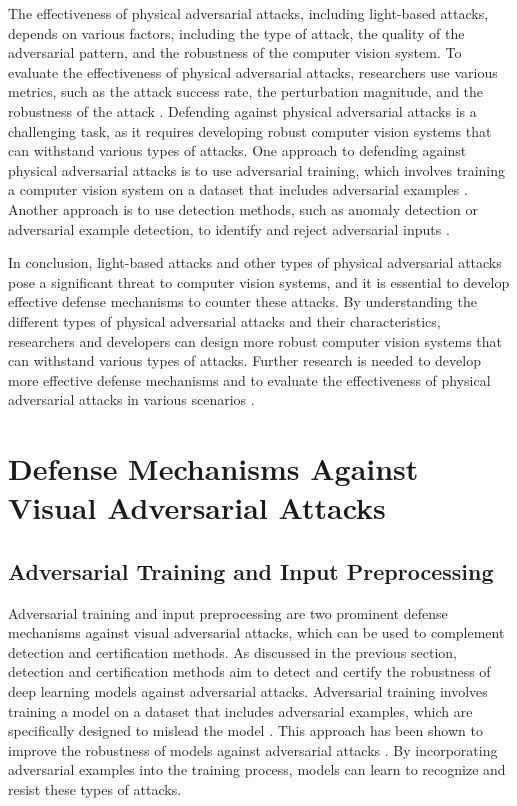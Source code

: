 \documentclass[11pt]{article}
\begin{document}
The effectiveness of physical adversarial attacks, including light-based attacks, depends on various factors, including the type of attack, the quality of the adversarial pattern, and the robustness of the computer vision system. To evaluate the effectiveness of physical adversarial attacks, researchers use various metrics, such as the attack success rate, the perturbation magnitude, and the robustness of the attack \cite{ref11}. Defending against physical adversarial attacks is a challenging task, as it requires developing robust computer vision systems that can withstand various types of attacks. One approach to defending against physical adversarial attacks is to use adversarial training, which involves training a computer vision system on a dataset that includes adversarial examples \cite{ref65}. Another approach is to use detection methods, such as anomaly detection or adversarial example detection, to identify and reject adversarial inputs \cite{ref66}.

In conclusion, light-based attacks and other types of physical adversarial attacks pose a significant threat to computer vision systems, and it is essential to develop effective defense mechanisms to counter these attacks. By understanding the different types of physical adversarial attacks and their characteristics, researchers and developers can design more robust computer vision systems that can withstand various types of attacks. Further research is needed to develop more effective defense mechanisms and to evaluate the effectiveness of physical adversarial attacks in various scenarios \cite{ref36}.

\section{Defense Mechanisms Against Visual Adversarial Attacks}

\subsection{Adversarial Training and Input Preprocessing}

Adversarial training and input preprocessing are two prominent defense mechanisms against visual adversarial attacks, which can be used to complement detection and certification methods. As discussed in the previous section, detection and certification methods aim to detect and certify the robustness of deep learning models against adversarial attacks. Adversarial training involves training a model on a dataset that includes adversarial examples, which are specifically designed to mislead the model \cite{ref67}. This approach has been shown to improve the robustness of models against adversarial attacks \cite{ref68}. By incorporating adversarial examples into the training process, models can learn to recognize and resist these types of attacks.
\end{document}
